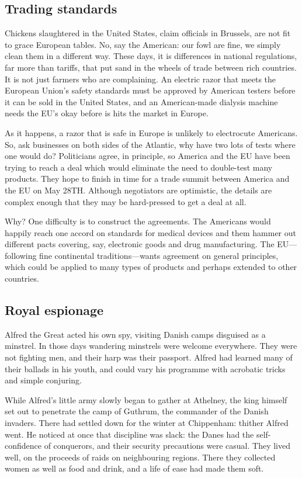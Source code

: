 \documentclass[11pt]{article}
\begin{document}
\subsection{Trading standards}
\label{sec-2-8}

Chickens slaughtered in the United States, claim officials in Brussels, are not fit to grace European tables. No, say the American: our fowl are fine, we simply clean them in a different way. These days, it is differences in national regulations, far more than tariffs, that put sand in the wheels of trade between rich countries. It is not just farmers who are complaining. An electric razor that meets the European Union's safety standards must be approved by American testers before it can be sold in the United States, and an American-made dialysis machine needs the EU's okay before is hits the market in Europe.

As it happens, a razor that is safe in Europe is unlikely to electrocute Americans. So, ask businesses on both sides of the Atlantic, why have two lots of tests where one would do? Politicians agree, in principle, so America and the EU have been trying to reach a deal which would eliminate the need to double-test many products. They hope to finish in time for a trade summit between America and the EU on May 28TH. Although negotiators are optimistic, the details are complex enough that they may be hard-pressed to get a deal at all.

Why? One difficulty is to construct the agreements. The Americans would happily reach one accord on standards for medical devices and them hammer out different pacts covering, say, electronic goods and drug manufacturing. The EU---following fine continental traditions---wants agreement on general principles, which could be applied to many types of products and perhaps extended to other countries.
\subsection{Royal espionage}
\label{sec-2-9}

Alfred the Great acted his own spy, visiting Danish camps disguised as a minstrel. In those days wandering minstrels were welcome everywhere. They were not fighting men, and their harp was their passport. Alfred had learned many of their ballads in his youth, and could vary his programme with acrobatic tricks and simple conjuring.

While Alfred's little army slowly began to gather at Athelney, the king himself set out to penetrate the camp of Guthrum, the commander of the Danish invaders. There had settled down for the winter at Chippenham: thither Alfred went. He noticed at once that discipline was slack: the Danes had the self-confidence of conquerors, and their security precautions were casual. They lived well, on the proceeds of raids on neighbouring regions. There they collected women as well as food and drink, and a life of ease had made them soft.
\end{document}
